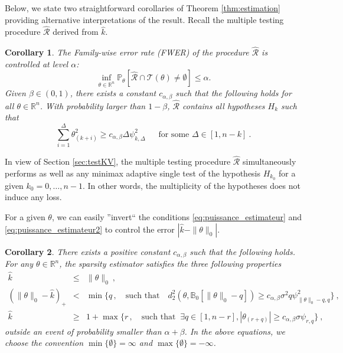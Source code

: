\documentclass[twoside,11pt]{article}
\newtheorem{cor}{Corollary}
\def\cR{\mathcal{R}}
\newcommand{\<}{\langle}
\renewcommand{\>}{\rangle}
\begin{document}
Below, we state two straightforward corollaries of Theorem \ref{thm:estimation} providing alternative interpretations of the result. Recall the multiple testing procedure $\widehat{\cR}$ derived from $\widehat{k}$. 
\begin{cor}\label{cor:test_estimation}
The Family-wise error rate (FWER) of the procedure $\widehat{\cR}$ is controlled at level $\alpha$:
\[
\inf_{\theta\in \mathbb{R}^n}\mathbb{P}_{\theta}[\widehat{\mathcal{R}}\cap \mathcal{T}(\theta)\neq \emptyset ]\leq \alpha.
\]
Given $\beta\in(0,1)$, there exists a constant $c_{\alpha,\beta}$ such that the following holds for all $\theta\in \mathbb{R}^n$. With probability larger than $1-\beta$, $\widehat{\cR}$ contains all hypotheses  $H_k$ such that 
\[
 \sum_{i=1}^{\Delta}\theta_{(k+i)}^2\geq c_{\alpha,\beta }\Delta \psi^2_{k,\Delta}\ \quad  \text{ for some  }\Delta\in [1,n-k]\ .
\]
\end{cor}
In view of Section \ref{sec:testKV}, the multiple testing procedure $\widehat{\cR}$ simultaneously  performs as well as any minimax adaptive single test of the hypothesis $H_{k_0}$ for a given $k_0=0,\ldots, n-1$. In other words, the multiplicity of the hypotheses does not induce any loss. 



For a given $\theta$, we can easily ''invert`` the conditions  \eqref{eq:puissance_estimateur} and  \eqref{eq:puissance_estimateur2} to control the error $|\widehat{k}-\|\theta\|_0|$.

\begin{cor}\label{cor:rate_estimation}
 There exists a positive constant $c_{\alpha,\beta}$  such that the following holds.
 For any $\theta\in \mathbb{R}^n$, the sparsity estimator satisfies the three following properties
 \begin{eqnarray}  \label{eq:lower|theta|_0}
 \widehat{k}&\leq& \|\theta\|_0 \ ,\\
 \label{eq:upper_rate_|theta|_0}
 (\|\theta\|_0-\widehat{k})_+ &<& \min \big\{q\, , \quad  \text{such that} \quad d^2_2(\theta, \mathbb{B}_0[\|\theta\|_0-q])\geq c_{\alpha,\beta}\sigma^2 q \psi^2_{\|\theta\|_0-q,q}    \big\}\ , \\
  \label{eq:upper_rate_|theta|_0_l_infty}
 \widehat{k}&\geq& 1+ \max \big\{r\, , \quad  \text{such that }\ \exists q \in [1,n-r ], |\theta_{(r+q)}|\geq c_{\alpha,\beta}\sigma \psi_{r,q}    \big\}\ ,
 \end{eqnarray}
 outside an event of probability smaller than $\alpha+\beta$. In the above equations, we choose the convention $\min\{\emptyset\}= \infty$ and $\max\{\emptyset\}=- \infty$.
\end{cor}
\end{document}
